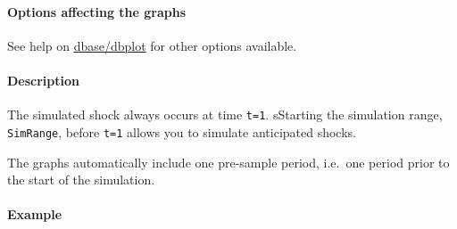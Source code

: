  \paragraph{Options affecting the graphs}
 
 See help on \url{dbase/dbplot} for other options available.
 
 \paragraph{Description}
 
 The simulated shock always occurs at time \texttt{t=1}. sStarting the
 simulation range, \texttt{SimRange}, before \texttt{t=1} allows you to
 simulate anticipated shocks.
 
 The graphs automatically include one pre-sample period, i.e.~one period
 prior to the start of the simulation.
 
 \paragraph{Example}


